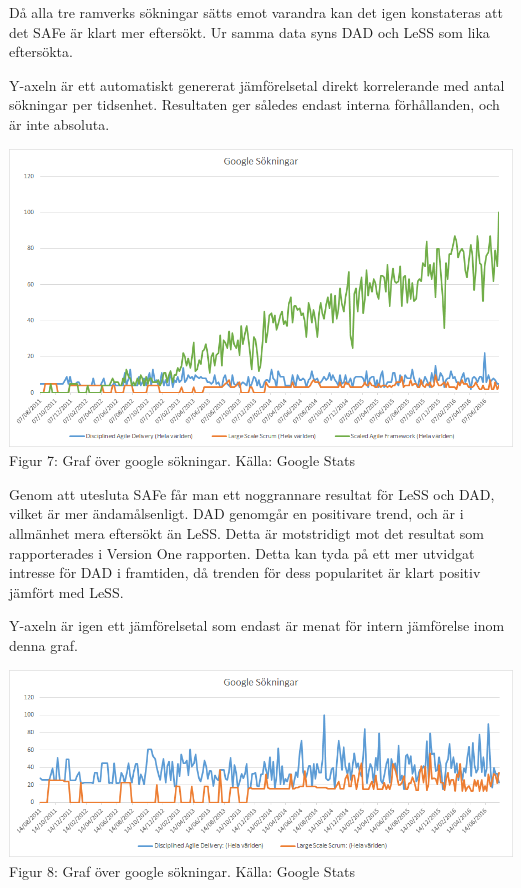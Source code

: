 		Då alla tre ramverks sökningar sätts emot varandra kan det igen konstateras att det SAFe är klart mer eftersökt. Ur samma data syns DAD och LeSS som lika eftersökta.
		
		Y-axeln är ett automatiskt genererat jämförelsetal direkt korrelerande med antal sökningar per tidsenhet. Resultaten ger således endast interna förhållanden, och är inte absoluta.
		\begin{center}
			\includegraphics{Grafer/Google_sokningar.png}
			\\ Figur 7: Graf över google sökningar. Källa: Google Stats \cite{google_stats}
		\end{center}
	
	
		Genom att utesluta SAFe får man ett noggrannare resultat för LeSS och DAD, vilket är mer ändamålsenligt. DAD genomgår en positivare trend, och är i allmänhet mera eftersökt än LeSS. Detta är motstridigt mot det resultat som rapporterades i Version One rapporten. Detta kan tyda på ett mer utvidgat intresse för DAD i framtiden, då trenden för dess popularitet är klart positiv jämfört med LeSS.
	
		Y-axeln är igen ett jämförelsetal som endast är menat för intern jämförelse inom denna graf.
		\begin{center}
			\includegraphics{Grafer/Google_sokningar_dad_less.png}
			\\ Figur 8: Graf över google sökningar. Källa: Google Stats \cite{google_stats_dad_less}
		\end{center}
		
